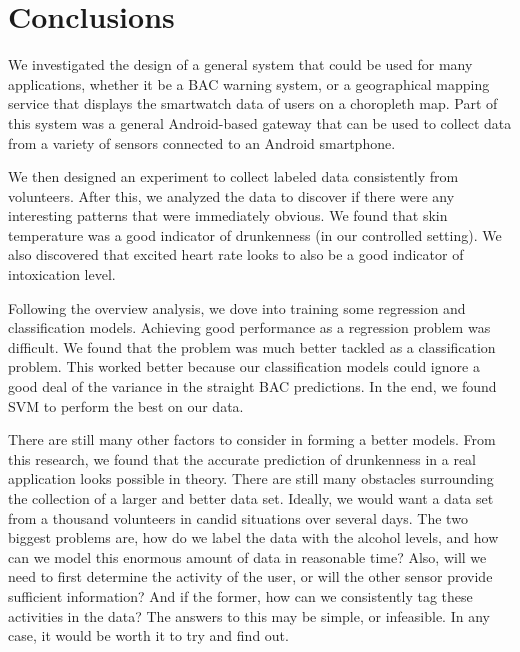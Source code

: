 \section{Conclusions}

We investigated the design of a general system that could be used for many applications, whether it be a BAC warning system, or a geographical mapping service that displays the smartwatch data of users on a choropleth map. Part of this system was a general Android-based gateway that can be used to collect data from a variety of sensors connected to an Android smartphone.

We then designed an experiment to collect labeled data consistently from volunteers. After this, we analyzed the data to discover if there were any interesting patterns that were immediately obvious. We found that skin temperature was a good indicator of drunkenness (in our controlled setting). We also discovered that excited heart rate looks to also be a good indicator of intoxication level.

Following the overview analysis, we dove into training some regression and classification models. Achieving good performance as a regression problem was difficult. We found that the problem was much better tackled as a classification problem. This worked better because our classification models could ignore a good deal of the variance in the straight BAC predictions. In the end, we found SVM to perform the best on our data.

There are still many other factors to consider in forming a better models. From this research, we found that the accurate prediction of drunkenness in a real application looks possible in theory. There are still many obstacles surrounding the collection of a larger and better data set. Ideally, we would want a data set from a thousand volunteers in candid situations over several days. The two biggest problems are, how do we label the data with the alcohol levels, and how can we model this enormous amount of data in reasonable time? Also, will we need to first determine the activity of the user, or will the other sensor provide sufficient information? And if the former, how can we consistently tag these activities in the data? The answers to this may be simple, or infeasible. In any case, it would be worth it to try and find out.